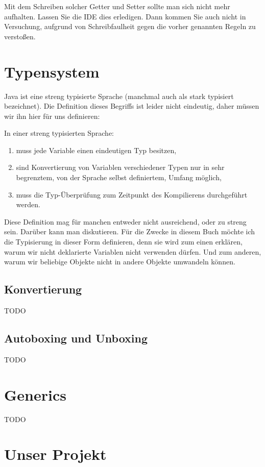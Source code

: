 Mit dem Schreiben solcher Getter und Setter sollte man sich nicht mehr aufhalten. Lassen Sie die IDE dies erledigen. Dann kommen Sie auch nicht in Versuchung, aufgrund von Schreibfaulheit gegen die vorher genannten Regeln zu verstoßen.


\section{Typensystem}

Java ist eine streng typisierte Sprache (manchmal auch als stark typisiert bezeichnet). Die Definition dieses Begriffs ist leider nicht eindeutig, daher müssen wir ihn hier für uns definieren:

In einer streng typisierten Sprache:
\begin{enumerate}
\item muss jede Variable ei\-nen eindeutigen Typ besitzen,
\item sind Konvertierung von Variablen verschiedener Typen nur in sehr begrenztem, von der Sprache selbst definiertem, Umfang möglich,
\item muss die Typ-Überprüfung zum Zeitpunkt des Kompilierens durchgeführt werden.
\end{enumerate}

Diese Definition mag für manchen entweder nicht ausreichend, oder zu streng sein. Darüber kann man diskutieren. Für die Zwecke in diesem Buch möchte ich die Typisierung in dieser Form definieren, denn sie wird zum einen erklären, warum wir nicht deklarierte Variablen nicht verwenden dürfen. Und zum anderen, warum wir beliebige Objekte nicht in andere Objekte umwandeln können.

\subsection{Konvertierung}\label{ref:conversion}
TODO


\subsection{Autoboxing und Unboxing}\label{ref:autoboxing}
TODO


\section{Generics}
TODO

\section{Unser Projekt}

